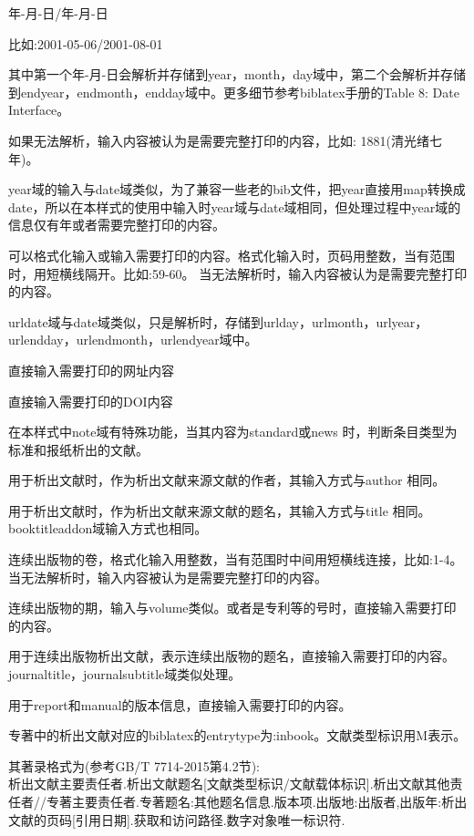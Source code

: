 \documentclass[11pt]{article} %
\begin{document}
\begin{description}[topsep=5pt,partopsep=0pt,parsep=0pt,%
itemsep=0pt,leftmargin=2.2cm,rightmargin=0.5cm,labelwidth=2cm]
      年-月-日/年-月-日

      比如:2001-05-06/2001-08-01

      其中第一个年-月-日会解析并存储到year，month，day域中，第二个会解析并存储到endyear，endmonth，endday域中。更多细节参考biblatex手册的Table 8: Date Interface。

      如果无法解析，输入内容被认为是需要完整打印的内容，比如:
      1881(清光绪七年)。

      year域的输入与date域类似，为了兼容一些老的bib文件，把year直接用map转换成date，所以在本样式的使用中输入时year域与date域相同，但处理过程中year域的信息仅有年或者需要完整打印的内容。

  \item[pages] 可以格式化输入或输入需要打印的内容。格式化输入时，页码用整数，当有范围时，用短横线隔开。比如:59-60。 当无法解析时，输入内容被认为是需要完整打印的内容。
  \item[urldate] urldate域与date域类似，只是解析时，存储到urlday，urlmonth，urlyear，urlendday，urlendmonth，urlendyear域中。
  \item[url] 直接输入需要打印的网址内容
  \item[doi] 直接输入需要打印的DOI内容
  \item[note] 在本样式中note域有特殊功能，当其内容为standard或news 时，判断条目类型为标准和报纸析出的文献。
  \item[bookauthor] 用于析出文献时，作为析出文献来源文献的作者，其输入方式与author 相同。
  \item[booktitle] 用于析出文献时，作为析出文献来源文献的题名，其输入方式与title 相同。booktitleaddon域输入方式也相同。
  \item[volume] 连续出版物的卷，格式化输入用整数，当有范围时中间用短横线连接，比如:1-4。当无法解析时，输入内容被认为是需要完整打印的内容。
  \item[number] 连续出版物的期，输入与volume类似。或者是专利等的号时，直接输入需要打印的内容。
  \item[journal] 用于连续出版物析出文献，表示连续出版物的题名，直接输入需要打印的内容。journaltitle，journalsubtitle域类似处理。
   \item[version] 用于report和manual的版本信息，直接输入需要打印的内容。
\end{description}

\begin{refentry}{}{}
专著中的析出文献对应的biblatex的entrytype为:inbook。文献类型标识用M表示。

其著录格式为(参考GB/T 7714-2015第4.2节):\\
析出文献主要责任者.析出文献题名[文献类型标识/文献载体标识].析出文献其他责任者//专著主要责任者.专著题名:其他题名信息.版本项.出版地:出版者,出版年:析出文献的页码[引用日期].获取和访问路径.数字对象唯一标识符.
\end{refentry}
\end{document}
